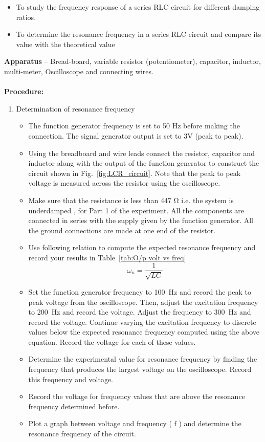 \documentclass[9pt]{scrreprt}
\begin{document}
\begin{itemize}
\item To study the frequency response of a series RLC circuit for different damping ratios.
\item To determine the resonance frequency in a series RLC circuit and compare its value with the theoretical value
\end{itemize} 
\textbf{Apparatus} – Bread-board, variable resistor (potentiometer), capacitor, inductor, multi-meter, Oscilloscope and connecting wires.\\
\\
\textbf{Procedure:}
\begin{enumerate}
\item Determination of resonance frequency
\begin{itemize}
\item The function generator frequency is set to 50 Hz before making the connection. The signal generator output is set to 3V (peak to peak).
\item Using the breadboard and wire leads connect the resistor, capacitor and inductor along with the output of the function generator to construct the circuit shown in Fig.~\ref{fig:LCR_circuit}. Note that the peak to peak voltage is measured across the resistor using the oscilloscope.
\item Make sure that the resistance is less than 447 $\si{\ohm}$ i.e. the system is underdamped , for Part 1 of the experiment. All the components are connected in series with the supply given by the function generator. All the ground connections are made at one end of the resistor.
\item Use following relation to compute the expected resonance frequency and record your results in Table~\ref{tab:O/p volt vs freq}
\begin{equation*}
\omega_n = \frac{1}{\sqrt{LC}}
\end{equation*}

\item Set the function generator frequency to 100~Hz and record the peak to peak voltage from the oscilloscope. Then, adjust the excitation frequency to 200~Hz and record the voltage. Adjust the frequency to 300~Hz and record the voltage. Continue varying the excitation frequency to discrete values below the expected resonance frequency computed using the above equation. Record the voltage for each of these values.
\item Determine the experimental value for resonance frequency by finding the frequency that produces the largest voltage on the oscilloscope. Record this frequency and voltage.
\item Record the voltage for frequency values that are above the resonance frequency determined before.
\item Plot a graph between voltage and frequency ( f ) and determine the resonance frequency of the circuit.

\end{itemize}
\end{enumerate}
\end{document}
